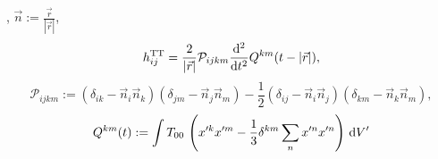\cite{Blanchet1997}, $\vec{n}:=\frac{\vec{r}}{\left\lvert\vec{r}\right\rvert}$,
\begin{equation}
    h_{ij}^{\text{TT}}=\frac{2}{\left\lvert\vec{r}\right\rvert}\mathcal{P}_{ijkm}\frac{\mathrm{d}^2}{\mathrm{d} t^2}{Q}^{km}(t-\left\lvert\vec{r}\right\rvert), \label{TT}
\end{equation}
\begin{equation}
    \mathcal{P}_{ijkm}:=
    \left(\delta_{ik} -\vec{n}_i\vec{n}_k\right)
    \left(\delta_{jm} -\vec{n}_j\vec{n}_m\right)
    -\frac{1}{2}
    \left(\delta_{ij} -\vec{n}_i\vec{n}_j\right)
    \left(\delta_{km} -\vec{n}_k\vec{n}_m\right),
\end{equation}
\begin{equation}
    Q^{km}(t):=\int{T}_{00}\,\left(x'^kx'^m-\frac{1}{3}\delta^{km}\sum_nx'^nx'^n\right)\,\mathrm{d} V'
\end{equation}
